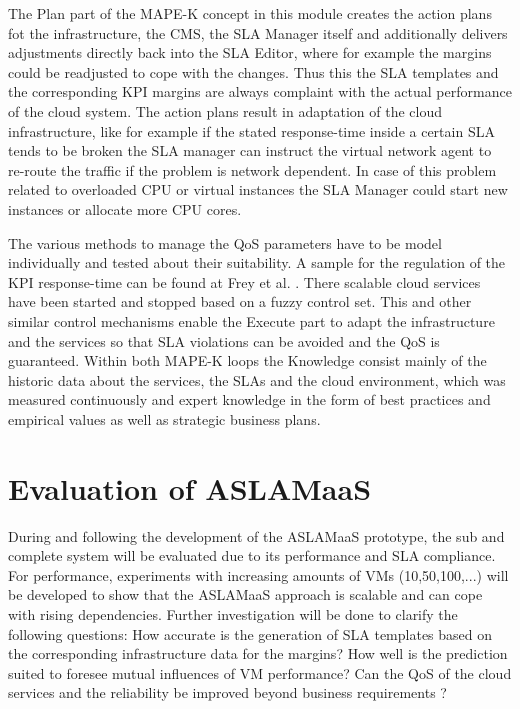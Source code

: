 The Plan part of the MAPE-K concept in this module creates the action plans fot the infrastructure, the CMS, the SLA Manager itself and additionally delivers adjustments directly back into the SLA Editor, where for example the margins could be readjusted to cope with the changes. Thus this the SLA templates and the corresponding KPI margins are always complaint with the actual performance of the cloud system. The action plans result in adaptation of the cloud infrastructure, like for example if the stated response-time inside a certain SLA tends to be broken the SLA manager can instruct the virtual network agent to re-route the traffic if the problem is network dependent. In case of this problem related to overloaded CPU or virtual instances the SLA Manager could start new instances or allocate more CPU cores.

The various methods to manage the QoS parameters have to be model individually and tested about their suitability. A sample for the regulation of the KPI response-time can be found at Frey et al. \cite{Fuzzy}. There scalable cloud services have been started and stopped based on a fuzzy control set. This and other similar control mechanisms enable the Execute part to adapt the infrastructure and the services so that SLA violations can be avoided and the QoS is guaranteed. Within both MAPE-K loops the Knowledge consist mainly of the historic data about the services, the SLAs and the cloud environment, which was measured continuously and expert knowledge in the form of best practices and empirical values as well as strategic business plans. %

\section{Evaluation of ASLAMaaS}
During and following the development of the ASLAMaaS prototype, the sub and complete system will be evaluated due to its performance and SLA compliance. For performance, experiments with increasing amounts of VMs (10,50,100,...) will be developed to show that the ASLAMaaS approach is scalable and can cope with rising dependencies. Further investigation will be done to clarify the following questions: How accurate is the generation of SLA templates based on the corresponding infrastructure data for the margins? How well is the prediction suited to foresee mutual influences of VM performance?  Can the QoS of the cloud services and the reliability be improved beyond business requirements ?

